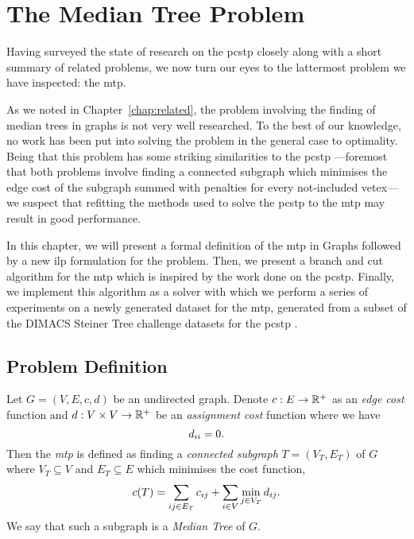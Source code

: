 \chapter{The Median Tree Problem}\label{chap:mediantree}
Having surveyed the state of research on the \gls{pcstp} closely along with a
short summary of related problems, we now turn our eyes to the lattermost problem
we have inspected: the \gls{mtp}.

As we noted in Chapter~\ref{chap:related},
the problem involving the finding of median trees
in graphs is not very well researched. To the best of our knowledge, no work has been put into solving
the problem in the general case to optimality.
Being that this problem has some striking similarities
to the \gls{pcstp} ---foremost that both problems involve finding a connected
subgraph which minimises the edge cost of the subgraph summed with
penalties for every not-included vetex--- we suspect that refitting the
methods used to solve the \gls{pcstp} to the \gls{mtp} may result in good performance.

In this chapter, we will present a formal definition of the \acrlong{mtp} in Graphs
followed by a new \gls{ilp} formulation for the problem.
Then, we present a branch and cut algorithm for the \gls{mtp} which is inspired by the
work done on the \gls{pcstp}. Finally, we implement this algorithm as a solver with which
we perform a series of experiments on a newly generated dataset
for the \gls{mtp}, generated from a subset
of the DIMACS Steiner Tree challenge datasets for the \gls{pcstp} \citep{DIMACS}.
 
\section{Problem Definition}

Let $G = (V, E, c, d)$ be an undirected graph. Denote $c : E \to \mathbb{R}^+$ as an \textit{edge cost} function
and $d : V \times V  \to \mathbb{R}^+$ be an \textit{assignment cost} function where we have
\[d_{ii} = 0 \mathnormal{.}\]
Then the \textit{\acrlong{mtp}}
is defined as finding a \textit{connected subgraph} $T = (V_T, E_T)$ of $G$
where $V_T \subseteq V$ and
$E_T \subseteq E$ which minimises the cost function,
\[c(T) = \sum_{ij \in E_T} c_{ij} + \sum_{i \in V} \min_{j \in V_T} d_{ij}\mathnormal{.}\]
We say that such a subgraph is a \textit{Median Tree} of $G$.

